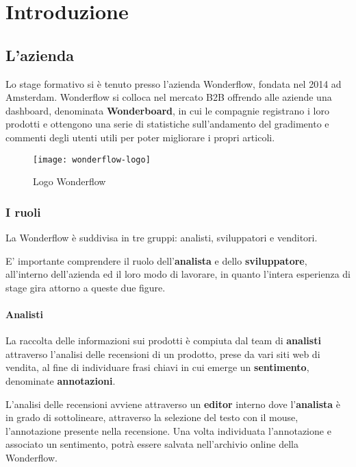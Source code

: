 \mainmatter
\chapter{Introduzione}
\label{cap:introduzione}

\section{L'azienda}
Lo stage formativo si è tenuto presso l'azienda Wonderflow, fondata nel 2014
ad Amsterdam. Wonderflow si colloca nel mercato \gls{B2B}
offrendo alle aziende una \gls{dashboard}, denominata \textbf{Wonderboard}, in
cui le compagnie registrano i loro prodotti e ottengono una serie di
statistiche sull'andamento del gradimento e commenti degli utenti utili per
poter migliorare i propri articoli.

\begin{figure}[htbp]
\begin{center}
\texttt{[image: wonderflow-logo]}
\caption{Logo Wonderflow}
\end{center}
\end{figure}

\subsection{I ruoli}
La Wonderflow è suddivisa in tre gruppi: analisti, sviluppatori e venditori.

E' importante comprendere il ruolo dell'\textbf{analista} e dello
\textbf{sviluppatore}, all'interno dell'azienda ed il loro modo di lavorare, in
quanto l'intera esperienza di stage gira attorno a queste due figure.

\subsubsection{Analisti}
La raccolta delle informazioni sui prodotti è compiuta dal team di
\textbf{analisti} attraverso l'analisi delle recensioni di un prodotto, prese
da vari siti web di vendita, al fine di individuare frasi chiavi in cui
emerge un \textbf{sentimento}, denominate \textbf{annotazioni}.

L'analisi delle recensioni avviene attraverso un \textbf{editor} interno dove
l'\textbf{analista} è in grado di sottolineare, attraverso la selezione del 
testo con il mouse, l'annotazione presente nella recensione. Una volta 
individuata l'annotazione e associato un sentimento, potrà essere salvata 
nell'archivio online della Wonderflow.

